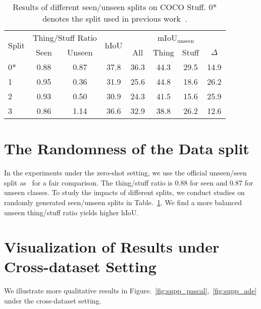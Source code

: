\documentclass[runningheads]{llncs}
\begin{document}
\begin{table}[]
\footnotesize
    \centering
    \caption{\footnotesize Results of different seen/unseen splits on COCO Stuff. 0* denotes the split used in previous work~\cite{xian2019semantic}.}
    \begin{tabular}{l|c|c|c|c|c|c|c}
    \toprule
    \multirow{2}{*}{Split}&\multicolumn{2}{c|}{Thing/Stuff Ratio}&\multirow{2}{*}{hIoU}&\multicolumn{4}{c}{mIoU$_{\text{unseen}}$}\\
    \cline{2-3} \cline{5-8}
    &Seen&Unseen&&All&Thing & Stuff & $\Delta$ \\
     \hline
     0*&0.88&0.87&37.8&36.3 &44.3 &29.5 &14.9\\
     \hline
     1&0.95&0.36&31.9&25.6&44.8&18.6&26.2\\
     2&0.93&0.50&30.9&	24.3&	41.5&	15.6&25.9\\
     3&0.86&1.14&36.6&32.9&38.8&26.2&12.6\\
     \bottomrule
    \end{tabular}
    \label{tab:randomness_of_split}
    \vspace{-2em}
\end{table}

\section{The Randomness of the Data split}
In the experiments under the zero-shot setting, we use the official unseen/seen split as~\cite{xian2019semantic} for a fair comparison. The thing/stuff ratio is 0.88 for seen and 0.87 for unseen classes. To study the impacts of different splits, we conduct studies on randomly generated seen/unseen splits in Table.~\ref{tab:randomness_of_split}. We find a more balanced unseen thing/stuff ratio yields higher hIoU.

\section{Visualization of Results under Cross-dataset Setting}
We illustrate more qualitative results in Figure.~\ref{fig:supp_pascal},~\ref{fig:supp_ade} under the cross-dataset setting. 
\end{document}
